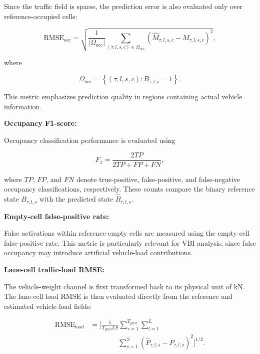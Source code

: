 \documentclass[journal]{IEEEtran}
\begin{document}
Since the traffic field is sparse, the prediction error is also evaluated only
over reference-occupied cells:

\begin{equation}
\mathrm{RMSE}_{\mathrm{occ}}
=
\sqrt{
\frac{1}{|\Omega_{\mathrm{occ}}|}
\sum_{(\tau,l,s,c)\in\Omega_{\mathrm{occ}}}
\left(
\widehat{M}_{\tau,l,s,c}
-
M_{\tau,l,s,c}
\right)^2
},
\end{equation}

where

\begin{equation}
\Omega_{\mathrm{occ}}
=
\left\{
(\tau,l,s,c)
:
B_{\tau,l,s}=1
\right\}.
\end{equation}

This metric emphasizes
prediction quality in regions containing actual vehicle information.

\textbf{Occupancy F1-score:}

Occupancy classification performance is evaluated using

\begin{equation}
F_1
=
\frac{2TP}
{2TP+FP+FN},
\end{equation}

where $TP$, $FP$, and $FN$ denote true-positive, false-positive, and false-negative occupancy classifications, respectively. These counts compare the binary reference state $B_{\tau,l,s}$ with the predicted state $\widehat{B}_{\tau,l,s}$.

\textbf{Empty-cell false-positive rate:}

False activations within reference-empty cells are measured using the
empty-cell false-positive rate. This metric is particularly relevant for VBI
analysis, since false occupancy may introduce artificial vehicle-load
contributions.

\textbf{Lane-cell traffic-load RMSE:}

The vehicle-weight channel is first transformed back to its physical unit of
kN. The lane-cell load RMSE is then evaluated directly from the reference and
estimated vehicle-load fields:

\begin{equation}
\begin{aligned}
\mathrm{RMSE}_{\mathrm{load}}
&=
\Bigg[
\frac{1}
{T_{\mathrm{pred}}LS}
\sum_{\tau=1}^{T_{\mathrm{pred}}}
\sum_{l=1}^{L}
\\
&\qquad\qquad
\sum_{s=1}^{S}
\left(
\widehat{P}_{\tau,l,s}
-
P_{\tau,l,s}
\right)^2
\Bigg]^{1/2}.
\end{aligned}
\end{equation}
\end{document}
